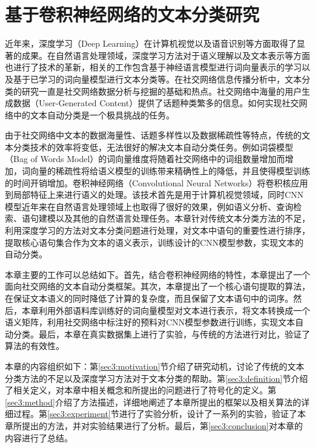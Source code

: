 \chapter{基于卷积神经网络的文本分类研究}
近年来，深度学习（Deep Learning）在计算机视觉以及语音识别等方面取得了显著的成果。在自然语言处理领域，深度学习方法对于语义理解以及文本表示等方面也进行了技术的革新，相关的工作包含基于神经语言模型进行词向量表示的学习以及基于已学习的词向量模型进行文本分类等。在社交网络信息传播分析中，文本分类的研究一直是社交网络数据分析与挖掘的基础和热点。社交网络中海量的用户生成数据（User-Generated Content）提供了话题种类繁多的信息。如何实现社交网络中的文本自动分类是一个极具挑战的任务。

由于社交网络中文本的数据海量性、话题多样性以及数据稀疏性等特点，传统的文本分类技术的效率将变低，无法很好的解决文本自动分类任务。例如词袋模型（Bag of Words Model）的词向量维度将随着社交网络中的词组数量增加而增加，词向量的稀疏性将给语义模型的训练带来精确性上的降低，并且使得模型训练的时间开销增加。卷积神经网络（Convolutional Neural Networks）将卷积核应用到局部特征上来进行语义的处理。该技术首先是用于计算机视觉领域，同时CNN模型近年来在自然语言处理领域上也取得了很好的效果，例如语义分析、查询检索、语句建模以及其他的自然语言处理任务。本章针对传统文本分类方法的不足，利用深度学习的方法对文本分类问题进行处理，对文本中语句的重要性进行排序，提取核心语句集合作为文本的语义表示，训练设计的CNN模型参数，实现文本的自动分类。

本章主要的工作可以总结如下。首先，结合卷积神经网络的特性，本章提出了一个面向社交网络的文本自动分类框架。其次，本章提出了一个核心语句提取的算法，在保证文本语义的同时降低了计算的复杂度，而且保留了文本语句中的词序。然后，本章利用外部语料库训练好的词向量模型对文本进行表示，将文本转换成一个语义矩阵，利用社交网络中标注好的预料对CNN模型参数进行训练，实现文本自动分类。最后，本章在真实数据集上进行了实验，与传统的方法进行对比，验证了算法的有效性。

本章的内容组织如下：第\ref{sec3:motivation}节介绍了研究动机，讨论了传统的文本分类方法的不足以及深度学习方法对于文本分类的帮助。第\ref{sec3:definition}节介绍了相关定义，对本章中相关概念和所提出的问题进行了符号化的定义。第\ref{sec3:method}介绍了方法描述，详细地阐述了本章所提出的框架以及相关算法的详细过程。第\ref{sec3:experiment}节进行了实验分析，设计了一系列的实验，验证了本章所提出的方法，并对实验结果进行了分析。最后，第\ref{sec3:conclusion}对本章的内容进行了总结。
